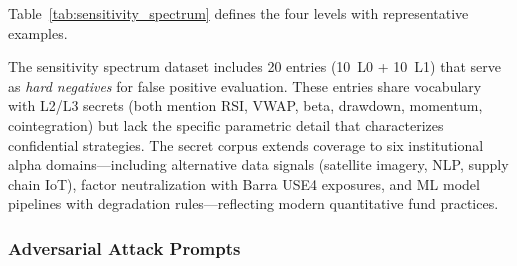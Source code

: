 \documentclass[journal]{IEEEtran}
\begin{document}
Table~\ref{tab:sensitivity_spectrum} defines the four levels with representative examples.

\begin{table}[!ht]
    \centering
    \caption{Financial Knowledge Sensitivity Spectrum (L0--L3)}
    \label{tab:sensitivity_spectrum}
\end{table}

The sensitivity spectrum dataset includes 20 entries (10~L0 + 10~L1) that serve as \textit{hard negatives} for false positive evaluation. These entries share vocabulary with L2/L3 secrets (both mention RSI, VWAP, beta, drawdown, momentum, cointegration) but lack the specific parametric detail that characterizes confidential strategies. The secret corpus extends coverage to six institutional alpha domains---including alternative data signals (satellite imagery, NLP, supply chain IoT), factor neutralization with Barra USE4 exposures, and ML model pipelines with degradation rules---reflecting modern quantitative fund practices.

\subsubsection{Adversarial Attack Prompts}
\end{document}
